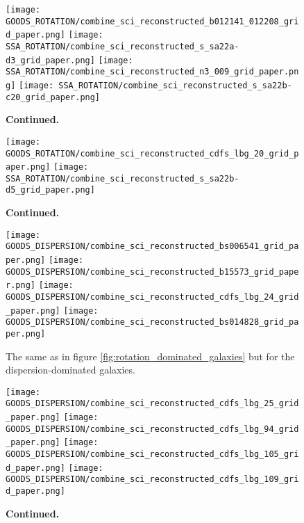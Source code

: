 \documentclass[fleqn,usenatbib]{mn2e}
\begin{document}
\begin{figure*}\ContinuedFloat
    \centering

    \texttt{[image: GOODS\_ROTATION/combine\_sci\_reconstructed\_b012141\_012208\_grid\_paper.png]}
    \texttt{[image: SSA\_ROTATION/combine\_sci\_reconstructed\_s\_sa22a-d3\_grid\_paper.png]}
    \texttt{[image: SSA\_ROTATION/combine\_sci\_reconstructed\_n3\_009\_grid\_paper.png]}
    \texttt{[image: SSA\_ROTATION/combine\_sci\_reconstructed\_s\_sa22b-c20\_grid\_paper.png]}

    \caption{\textbf{Continued.}}

\end{figure*}

\begin{figure*}\ContinuedFloat
\centering

    \texttt{[image: GOODS\_ROTATION/combine\_sci\_reconstructed\_cdfs\_lbg\_20\_grid\_paper.png]}
    \texttt{[image: SSA\_ROTATION/combine\_sci\_reconstructed\_s\_sa22b-d5\_grid\_paper.png]}

    \caption{\textbf{Continued.}}

\end{figure*}

\begin{figure*}
    \centering

    \texttt{[image: GOODS\_DISPERSION/combine\_sci\_reconstructed\_bs006541\_grid\_paper.png]}
    \texttt{[image: GOODS\_DISPERSION/combine\_sci\_reconstructed\_b15573\_grid\_paper.png]}
    \texttt{[image: GOODS\_DISPERSION/combine\_sci\_reconstructed\_cdfs\_lbg\_24\_grid\_paper.png]}
    \texttt{[image: GOODS\_DISPERSION/combine\_sci\_reconstructed\_bs014828\_grid\_paper.png]}

    \caption{The same as in figure \protect\ref{fig:rotation_dominated_galaxies} but for the dispersion-dominated galaxies.}
    \label{fig:dispersion_dominated_galaxies}

\end{figure*}

\begin{figure*}\ContinuedFloat
\centering

    \texttt{[image: GOODS\_DISPERSION/combine\_sci\_reconstructed\_cdfs\_lbg\_25\_grid\_paper.png]}
    \texttt{[image: GOODS\_DISPERSION/combine\_sci\_reconstructed\_cdfs\_lbg\_94\_grid\_paper.png]}
    \texttt{[image: GOODS\_DISPERSION/combine\_sci\_reconstructed\_cdfs\_lbg\_105\_grid\_paper.png]}
    \texttt{[image: GOODS\_DISPERSION/combine\_sci\_reconstructed\_cdfs\_lbg\_109\_grid\_paper.png]}

    \caption{\textbf{Continued.}}

\end{figure*}
\end{document}
